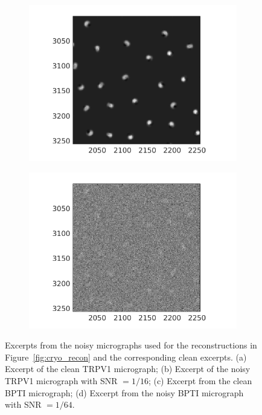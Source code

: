 \documentclass[12pt]{article}
\newcommand{\1}{\mathbf{1}}
\theoremstyle{plain}
\theoremstyle{definition}
\theoremstyle{remark}
\theoremstyle{plain}
\theoremstyle{remark}
\theoremstyle{plain}
\theoremstyle{plain}
\begin{document}
\begin{figure}[t!]
\begin{subfigure}[t]{0.245\textwidth}
		\includegraphics[scale=0.3]{clean_micro_BPTI.png}
		\caption{}
	\end{subfigure} \hfill
	\begin{subfigure}[t]{0.245\textwidth}
		\centering
		\includegraphics[scale=0.3]{noisy_micro_BPTI_SNR_64.png}
		\caption{}
	\end{subfigure}
	\caption{\label{fig:cryo_noisy_micros_for_rec}  {Excerpts from the noisy micrographs used for the reconstructions in Figure~\ref{fig:cryo_recon} and the corresponding clean excerpts. (a) Excerpt of the clean TRPV1 micrograph; (b) Excerpt of the noisy TRPV1 micrograph with SNR $= 1/16$; (c) Excerpt from the clean BPTI micrograph; (d) Excerpt from the noisy BPTI micrograph with SNR $= 1/64$.}} 
\end{figure}
\end{document}
